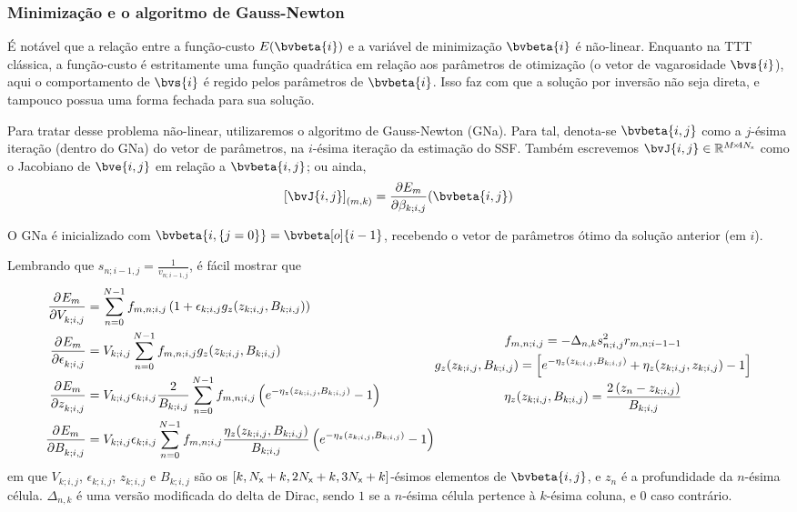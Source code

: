 \subsubsection*{Minimização e o algoritmo de Gauss-Newton}

É notável que a relação entre a função-custo $E(\bvbeta{i})$ e a variável de minimização $\bvbeta{i}$ é não-linear. Enquanto na TTT clássica, a função-custo é estritamente uma função quadrática em relação aos parâmetros de otimização (o vetor de vagarosidade $\bvs{i}$), aqui o comportamento de $\bvs{i}$ é regido pelos parâmetros de $\bvbeta{i}$. Isso faz com que a solução por inversão não seja direta, e tampouco possua uma forma fechada para sua solução.

Para tratar desse problema não-linear, utilizaremos o algoritmo de Gauss-Newton (GNa). Para tal, denota-se $\bvbeta{i,j}$ como a $j$-ésima iteração (dentro do GNa) do vetor de parâmetros, na $i$-ésima iteração da estimação do SSF. Também escrevemos $\bvJ{i,j} \in \re^{\sz{M}{4N_{\x}}}$ como o Jacobiano de $\bve{i,j}$ em relação a $\bvbeta{i,j}$; ou ainda,
\begin{equation}
	\el{\bvJ{i,j}}{m,k} = \frac{\partial E_m}{\partial \beta_{k;i,j}}(\bvbeta{i,j})
\end{equation}

O GNa é inicializado com $\bvbeta{i,\{j=0\}} = \bvbeta[o]{i-1}$, recebendo o vetor de parâmetros ótimo da solução anterior (em $i$).

Lembrando que $s_{n;i-1,j} = \frac{1}{v_{n;i-1,j}}$, é fácil mostrar que
\begin{subequations}
	\begin{align}
		\pdv{E_m}{V_{k;i,j}} & = \sum_{n=0}^{N-1} f_{m,n;i,j} \pts{1 + \epsilon_{k;i,j} g_z(z_{k;i,j},B_{k;i,j}) } \\
		\pdv{E_m}{\epsilon_{k;i,j}} & = V_{k;i,j} \sum_{n=0}^{N-1} f_{m,n;i,j} g_z(z_{k;i,j},B_{k;i,j}) \\
		\pdv{E_m}{z_{k;i,j}} & = V_{k;i,j} \epsilon_{k;i,j} \frac{2}{B_{k;i,j}} \sum_{n=0}^{N-1} f_{m,n;i,j} \pts{e^{-\eta_z(z_{k;i,j},B_{k;i,j})} - 1} \\
		\pdv{E_m}{B_{k;i,j}} & = V_{k;i,j} \epsilon_{k;i,j} \sum_{n=0}^{N-1} f_{m,n;i,j} \frac{\eta_z(z_{k;i,j},B_{k;i,j})}{B_{k;i,j}} \pts{e^{-\eta_z(z_{k;i,j},B_{k;i,j})} - 1}
	\end{align}
	\begin{gather}
		f_{m,n;i,j} = - \Delta_{n,k} s^2_{n;i,j} r_{m,n;i-1-1} \\
		g_z(z_{k;i,j},B_{k;i,j}) = \bts{e^{-\eta_z(z_{k;i,j},B_{k;i,j})} + \eta_z(z_{k;i,j},z_{k;i,j}) - 1 } \\
	\eta_z(z_{k;i,j},B_{k;i,j}) = \frac{2\pts{z_n - z_{k;i,j}}}{B_{k;i,j}}
	\end{gather}	
\end{subequations}
em que $V_{k;i,j}$, $\epsilon_{k;i,j}$, $z_{k;i,j}$ e $B_{k;i,j}$ são os $[k,N_{{\textsf{x}}}+k,2N_{{\textsf{x}}}+k,3N_{{\textsf{x}}}+k]$-ésimos elementos de $\bvbeta{i,j}$, e $z_n$ é a profundidade da $n$-ésima célula. $\Delta_{n,k}$ é uma versão modificada do delta de Dirac, sendo $1$ se a $n$-ésima célula pertence à $k$-ésima coluna, e $0$ caso contrário.


